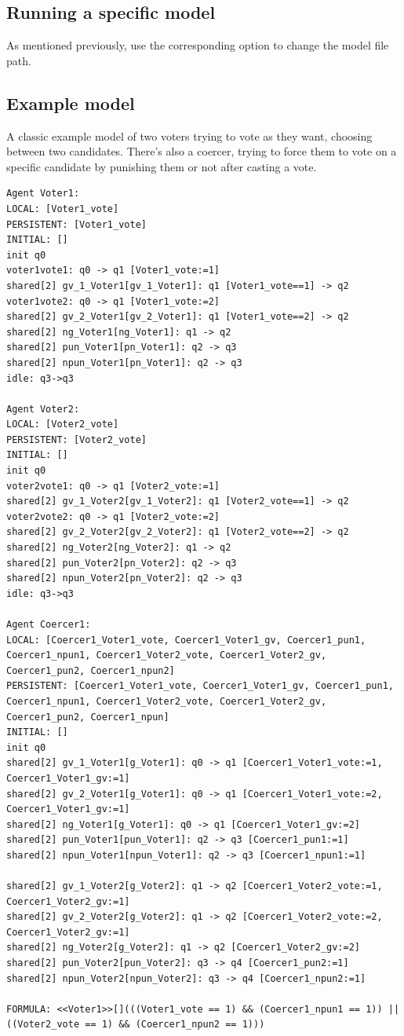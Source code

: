 \documentclass[12pt]{article}
\begin{document}
\subsection{Running a specific model}
As mentioned previously, use the corresponding option to change the model file path.

\subsection{Example model}
A classic example model of two voters trying to vote as they want, choosing between two candidates. There's also a coercer, trying to force them to vote on a specific candidate by punishing them or not after casting a vote.
\begin{lstlisting}
Agent Voter1:
LOCAL: [Voter1_vote]
PERSISTENT: [Voter1_vote]
INITIAL: []
init q0
voter1vote1: q0 -> q1 [Voter1_vote:=1]
shared[2] gv_1_Voter1[gv_1_Voter1]: q1 [Voter1_vote==1] -> q2
voter1vote2: q0 -> q1 [Voter1_vote:=2]
shared[2] gv_2_Voter1[gv_2_Voter1]: q1 [Voter1_vote==2] -> q2
shared[2] ng_Voter1[ng_Voter1]: q1 -> q2
shared[2] pun_Voter1[pn_Voter1]: q2 -> q3
shared[2] npun_Voter1[pn_Voter1]: q2 -> q3
idle: q3->q3

Agent Voter2:
LOCAL: [Voter2_vote]
PERSISTENT: [Voter2_vote]
INITIAL: []
init q0
voter2vote1: q0 -> q1 [Voter2_vote:=1]
shared[2] gv_1_Voter2[gv_1_Voter2]: q1 [Voter2_vote==1] -> q2
voter2vote2: q0 -> q1 [Voter2_vote:=2]
shared[2] gv_2_Voter2[gv_2_Voter2]: q1 [Voter2_vote==2] -> q2
shared[2] ng_Voter2[ng_Voter2]: q1 -> q2
shared[2] pun_Voter2[pn_Voter2]: q2 -> q3
shared[2] npun_Voter2[pn_Voter2]: q2 -> q3
idle: q3->q3

Agent Coercer1:
LOCAL: [Coercer1_Voter1_vote, Coercer1_Voter1_gv, Coercer1_pun1, Coercer1_npun1, Coercer1_Voter2_vote, Coercer1_Voter2_gv, Coercer1_pun2, Coercer1_npun2]
PERSISTENT: [Coercer1_Voter1_vote, Coercer1_Voter1_gv, Coercer1_pun1, Coercer1_npun1, Coercer1_Voter2_vote, Coercer1_Voter2_gv, Coercer1_pun2, Coercer1_npun]
INITIAL: []
init q0
shared[2] gv_1_Voter1[g_Voter1]: q0 -> q1 [Coercer1_Voter1_vote:=1, Coercer1_Voter1_gv:=1]
shared[2] gv_2_Voter1[g_Voter1]: q0 -> q1 [Coercer1_Voter1_vote:=2, Coercer1_Voter1_gv:=1]
shared[2] ng_Voter1[g_Voter1]: q0 -> q1 [Coercer1_Voter1_gv:=2]
shared[2] pun_Voter1[pun_Voter1]: q2 -> q3 [Coercer1_pun1:=1]
shared[2] npun_Voter1[npun_Voter1]: q2 -> q3 [Coercer1_npun1:=1]

shared[2] gv_1_Voter2[g_Voter2]: q1 -> q2 [Coercer1_Voter2_vote:=1, Coercer1_Voter2_gv:=1]
shared[2] gv_2_Voter2[g_Voter2]: q1 -> q2 [Coercer1_Voter2_vote:=2, Coercer1_Voter2_gv:=1]
shared[2] ng_Voter2[g_Voter2]: q1 -> q2 [Coercer1_Voter2_gv:=2]
shared[2] pun_Voter2[pun_Voter2]: q3 -> q4 [Coercer1_pun2:=1]
shared[2] npun_Voter2[npun_Voter2]: q3 -> q4 [Coercer1_npun2:=1]

FORMULA: <<Voter1>>[](((Voter1_vote == 1) && (Coercer1_npun1 == 1)) || ((Voter2_vote == 1) && (Coercer1_npun2 == 1)))
\end{lstlisting}
\end{document}
